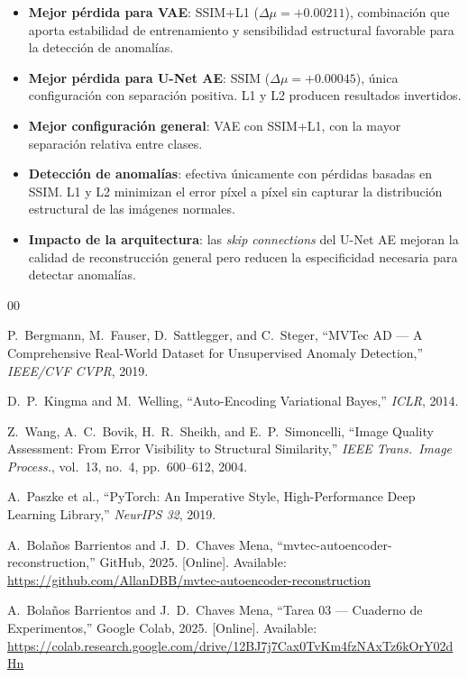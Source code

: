 \documentclass[conference]{IEEEtran}
\begin{document}
\begin{itemize}
  \item \textbf{Mejor p\'erdida para VAE}: SSIM+L1 ($\Delta\mu = +0.00211$),
        combinaci\'on que aporta estabilidad de entrenamiento y
        sensibilidad estructural favorable para la detecci\'on de anomal\'ias.

  \item \textbf{Mejor p\'erdida para U-Net AE}: SSIM ($\Delta\mu = +0.00045$),
        \'unica configuraci\'on con separaci\'on positiva.
        L1 y L2 producen resultados invertidos.

  \item \textbf{Mejor configuraci\'on general}: VAE con SSIM+L1,
        con la mayor separaci\'on relativa entre clases.

  \item \textbf{Detecci\'on de anomal\'ias}: efectiva \'unicamente con
        p\'erdidas basadas en SSIM.
        L1 y L2 minimizan el error p\'ixel a p\'ixel sin capturar la
        distribuci\'on estructural de las im\'agenes normales.

  \item \textbf{Impacto de la arquitectura}: las \textit{skip connections}
        del U-Net AE mejoran la calidad de reconstrucci\'on general pero
        reducen la especificidad necesaria para detectar anomal\'ias.
\end{itemize}

\begin{thebibliography}{00}

P.~Bergmann, M.~Fauser, D.~Sattlegger, and C.~Steger,
``MVTec AD --- A Comprehensive Real-World Dataset for Unsupervised
Anomaly Detection,''
\textit{IEEE/CVF CVPR}, 2019.

D.~P.~Kingma and M.~Welling,
``Auto-Encoding Variational Bayes,''
\textit{ICLR}, 2014.

Z.~Wang, A.~C.~Bovik, H.~R.~Sheikh, and E.~P.~Simoncelli,
``Image Quality Assessment: From Error Visibility to Structural
Similarity,''
\textit{IEEE Trans.\ Image Process.}, vol.~13, no.~4, pp.~600--612, 2004.

A.~Paszke et al.,
``PyTorch: An Imperative Style, High-Performance Deep Learning Library,''
\textit{NeurIPS 32}, 2019.

A.~Bola\~nos Barrientos and J.~D.~Chaves Mena,
``mvtec-autoencoder-reconstruction,''
GitHub, 2025.
[Online]. Available: \url{https://github.com/AllanDBB/mvtec-autoencoder-reconstruction}

A.~Bola\~nos Barrientos and J.~D.~Chaves Mena,
``Tarea 03 --- Cuaderno de Experimentos,''
Google Colab, 2025.
[Online]. Available: \url{https://colab.research.google.com/drive/12BJ7j7Cax0TvKm4fzNAxTz6kOrY02dHn}

\end{thebibliography}
\end{document}
